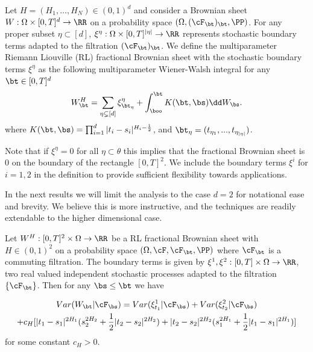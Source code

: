 \begin{defn}
Let $H=(H_1,\ldots,H_N)\in (0,1)^d$ and consider a Brownian sheet $W:\Omega\times [0,T]^d\rightarrow \RR$ on a probability space $(\Omega,(\cF_{\bt})_{\bt},\PP)$. For any proper subset  $\eta\subset [d]$,   $\xi^\eta:\Omega\times [0,T]^{|\eta|} \rightarrow \RR$ represents stochastic boundary terms adapted to the filtration $(\cF_{\bt})_{\bt}$. 
We define the multiparameter Riemann Liouville (RL) fractional Brownian sheet with the stochastic boundary terms $\xi^\eta$ as the following multiparameter Wiener-Walsh integral for any $\bt\in [0,T]^d$
\begin{equation}
    W^H_\bt = \sum_{\eta \subsetneq [d]} \xi_{\bt_{\eta}}^\eta + \int_\boo^\bt K(\bt,\bs) \dd W_\bs.
\end{equation}
where $K(\bt,\bs)= \prod_{i=1}^d |t_i-s_i|^{H_i-\frac{1}{2}}$, and $\bt_\eta=(t_{\eta_1},...,t_{\eta_{|\eta|}})$.
\end{defn}

\begin{rem}
Note that if $\xi^\eta=0$ for all $\eta\subset \theta$ this implies that the fractional Brownian sheet is $0$ on the boundary of the rectangle $[0,T]^2$.  We include the boundary terms $\xi^i$ for $i=1,2$ in the definition to provide sufficient flexibility towards applications.  
\end{rem}





In the next results we will limit the analysis to the case $d=2$ for notational ease and brevity. We believe this is more instructive, and the techniques are readily extendable to the higher dimensional case. 
 
\begin{prop}\label{prop:conditional variance}
 Let $W^H:[0,T]^2\times \Omega \rightarrow \RR$ be a RL fractional Brownian sheet with $H\in (0,1)^2$  on a probability space $(\Omega, \cF,\cF_{\bt},\PP)$ where $\cF_\bt$ is a commuting filtration. The boundary terms is given by $\xi^1,\xi^2:[0,T]\times \Omega \rightarrow \RR$, two real valued independent stochastic processes adapted to the filtration $\{\cF_\bt\}$. Then for any $\bs\leq \bt$ we have 

\begin{multline}\label{eq:conditional variance}
    Var(W_\bt|\cF_\bs) = 
    Var(\xi^1_{t_1}|\cF_\bs)+Var(\xi^2_{t_2}|\cF_\bs)
    \\
    +
    c_H[|t_1-s_1|^{2H_1}(s_2^{2H_2}+\frac{1}{2}|t_2-s_2|^{2H_2})+|t_2-s_2|^{2H_2}(s_1^{2H_1}+\frac{1}{2}|t_1-s_1|^{2H_1})]   
\end{multline}
for some constant $c_H>0$. 
\end{prop}

